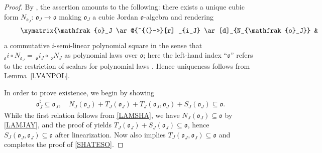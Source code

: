 \documentclass{amsart}
\theoremstyle{definition} %
\theoremstyle{remark} %
\newcommand{\mfo}{\mathfrak{o}}
\renewcommand{\:}{\colon\,}
\numberwithin{equation}{section}
\begin{document}
\begin{proof}
By \cite[34.10(b)]{MR4806163}, the assertion amounts to the following: there exists a unique cubic form $N_{\mfo_J}\:\mfo_J \to \mfo$ making $\mfo_J$ a cubic Jordan $\mfo$-algebra and rendering
\begin{align}
\vcenter{\label{ISEMILI}\xymatrix{\mfo_J \ar@{^{(}->}[r] _{i_J} \ar[d]_{N_{\mfo_J}} & J \ar[d]^{N_J} \\
\mfo \ar@{^{(}->}[r]_i & F}} 
\end{align}
a commutative $i$-semi-linear polynomial square in the sense that $_{\mfo}i \circ N_{\mfo_J} = \,_{\mfo}i_J \circ\,_{\mfo}N_J$ as polynomial laws over $\mfo$; here the left-hand index ``$\mfo$''  refers to the restriction of scalars  for polynomial laws \cite[12.27]{MR4806163}. Hence uniqueness follows from Lemma~\ref{l.VANPOL}.

In order to prove existence, we begin by showing
\begin{align}
\label{SHATESO} \mfo_J^\sharp \subseteq \mfo_J, \quad N_J(\mfo_J) + T_J(\mfo_J) + T_J(\mfo_J,\mfo_J) + S_J(\mfo_J) \subseteq \mfo.
\end{align}
While the first relation follows from \eqref{LAMSHA}, we have $N_J(\mfo_J) \subseteq \mfo$ by \eqref{LAMJAY}, and the proof of \cite[Satz~5.1]{MR0347922} yields $T_J(\mfo_J) + S_J(\mfo_J) \subseteq \mfo$, hence $S_J(\mfo_J,\mfo_J) \subseteq \mfo$ after linearization. Now \cite[(33a.13)]{MR4806163} also implies $T_J(\mfo_J,\mfo_J) \subseteq \mfo$ and completes the proof of \eqref{SHATESO}.


\end{proof}
\end{document}
